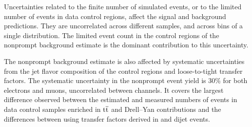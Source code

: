 Uncertainties related to the finite number of simulated events, or to the limited 
number of events in data control regions, affect the signal and background predictions. 
They are uncorrelated 
across different samples, and across bins of a single distribution. 
The limited event count in the control regions of the
nonprompt background estimate is the dominant contribution to this uncertainty.

The nonprompt background estimate is also affected by systematic uncertainties
from the jet flavor composition of the control regions and loose-to-tight transfer factors.
The systematic uncertainty in the nonprompt event yield is 30\%
for both electrons and muons, uncorrelated between channels.
It covers the largest difference observed
between the estimated and measured
numbers of events in data control samples enriched in
${\mathrm{t}\overline{\mathrm{t}}}$ and Drell--Yan contributions and the differences between 
using transfer factors derived in \Zpj and dijet events.


